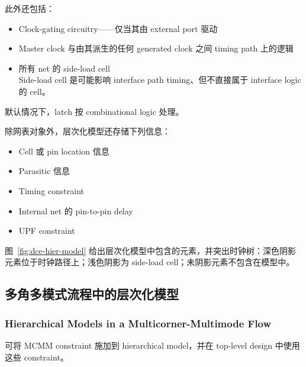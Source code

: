 此外还包括：
\begin{itemize}
  \item Clock-gating circuitry——仅当其由 external port 驱动
  \item Master clock 与由其派生的任何 generated clock 之间 timing path 上的逻辑
  \item 所有 net 的 side-load cell\\
        Side-load cell 是可能影响 interface path timing、但不直接属于 interface logic 的 cell。
\end{itemize}

\begin{noteBox}
默认情况下，latch 按 combinational logic 处理。
\end{noteBox}

除网表对象外，层次化模型还存储下列信息：
\begin{itemize}
  \item Cell 或 pin location 信息
  \item Parasitic 信息
  \item Timing constraint
  \item Internal net 的 pin-to-pin delay
  \item UPF constraint
\end{itemize}

图~\ref{fig:dce-hier-model} 给出层次化模型中包含的元素，并突出时钟树：深色阴影元素位于时钟路径上；浅色阴影为 side-load cell；未阴影元素不包含在模型中。


\subsection{多角多模式流程中的层次化模型}
\subsubsection*{Hierarchical Models in a Multicorner-Multimode Flow}

可将 MCMM constraint 施加到 hierarchical model，并在 top-level design 中使用这些 constraint。

